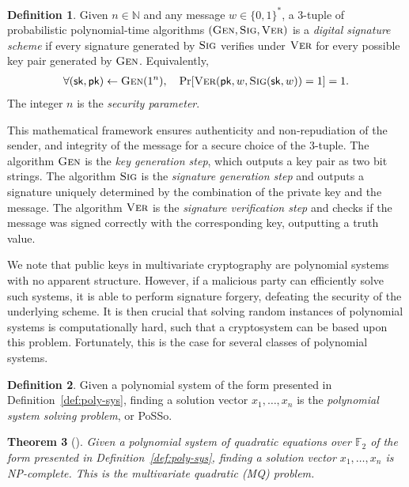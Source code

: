 \documentclass[12pt, a4paper, oneside]{memoir}
\newtheorem{theorem}{Theorem}[section]
\theoremstyle{definition}
\newtheorem{definition}[theorem]{Definition}
\begin{document}
\begin{definition}
  Given $n \in \mathbb{N}$ and any message $w \in \{0, 1\}^{*}$, a $3$-tuple of probabilistic polynomial-time algorithms $(\textsc{Gen}, \textsc{Sig}, \textsc{Ver})$ is a \emph{digital signature scheme} if every signature generated by $\textsc{Sig}$ verifies under $\textsc{Ver}$ for every possible key pair generated by $\textsc{Gen}$. Equivalently,
  \begin{align}
     \forall (\mathsf{sk}, \mathsf{pk}) \leftarrow \textsc{Gen}(1^{n}),
       \quad \Pr[\textsc{Ver}(\mathsf{pk}, w, \textsc{Sig}(\mathsf{sk}, w)) = 1] = 1.
  \end{align}
  The integer $n$ is the \emph{security parameter}.
\end{definition}

This mathematical framework ensures authenticity and non-repudiation of the sender, and integrity of the message for a secure choice of the $3$-tuple. The algorithm $\textsc{Gen}$ is the \emph{key generation step}, which outputs a key pair as two bit strings. The algorithm $\textsc{Sig}$ is the \emph{signature generation step} and outputs a signature uniquely determined by the combination of the private key and the message. The algorithm $\textsc{Ver}$ is the \emph{signature verification step} and checks if the message was signed correctly with the corresponding key, outputting a truth value.

We note that public keys in multivariate cryptography are polynomial systems with no apparent structure. However, if a malicious party can efficiently solve such systems, it is able to perform signature forgery, defeating the security of the underlying scheme. It is then crucial that solving random instances of polynomial systems is computationally hard, such that a cryptosystem can be based upon this problem. Fortunately, this is the case for several classes of polynomial systems.

\begin{definition}\label{def:posso}
  Given a polynomial system of the form presented in Definition~\ref{def:poly-sys}, finding a solution vector $x_{1}, \dots, x_{n}$ is the \emph{polynomial system solving problem}, or \textsf{PoSSo}.
\end{definition}

\begin{theorem}[{\cite[Appendix A]{Patarin:199711}}]
  Given a polynomial system of \emph{quadratic equations over $\mathbb{F}_{2}$} of the form presented in Definition~\ref{def:poly-sys}, finding a solution vector $x_{1}, \dots, x_{n}$ is NP-complete. This is the \emph{multivariate quadratic (MQ) problem}.
\end{theorem}
\end{document}
